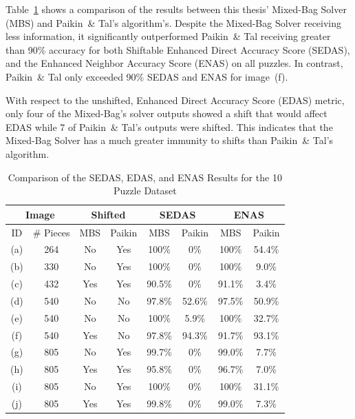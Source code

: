 Table~\ref{tab:pomeranzBestBuddiesVisualizations} shows a comparison of the results between this thesis' Mixed-Bag Solver (MBS) and Paikin~\& Tal's algorithm's.  Despite the Mixed-Bag Solver receiving less information, it significantly outperformed Paikin~\& Tal receiving greater than 90\% accuracy for both  Shiftable Enhanced Direct Accuracy Score (SEDAS), and the Enhanced Neighbor Accuracy Score (ENAS) on all puzzles.  In contrast, Paikin~\& Tal only exceeded 90\% SEDAS and ENAS for image~(f). 

With respect to the unshifted, Enhanced Direct Accuracy Score (EDAS) metric, only four of the Mixed-Bag's solver outputs showed a shift that would affect EDAS while 7 of Paikin~\& Tal's outputs were shifted. This indicates that the Mixed-Bag Solver has a much greater immunity to shifts than Paikin~\& Tal's algorithm.

\begin{table}[tb]
\begin{center}
\begin{tabular}{ c|c||c|c||c|c||c|c } 
 \toprule
 \multicolumn{2}{c||}{Image} & \multicolumn{2}{c||}{Shifted} & \multicolumn{2}{c||}{SEDAS} & \multicolumn{2}{c}{ENAS} \\
\hline
 ID  & \# Pieces & MBS & Paikin & MBS & Paikin & MBS & Paikin  \\ 
\hline \hline
 (a) &  264     & No  & Yes & 100\%  & 0\% & 100\% & 54.4\% \\ 
\hline
 (b) &  330     & No  & Yes & 100\%  & 0\% & 100\% &  9.0\% \\ 
\hline
 (c) &  432     & Yes & Yes & 90.5\% &  0\%   & 91.1\% & 3.4\% \\  
\hline
 (d) &  540     & No  & No  & 97.8\% & 52.6\% & 97.5\% & 50.9\% \\ 
\hline
 (e) &  540     & No  & No  & 100\%  &  5.9\% & 100\%  & 32.7\% \\ 
\hline
 (f) &  540     & Yes & No  & 97.8\% & 94.3\% & 91.7\% & 93.1\% \\ 
\hline
 (g) &  805     & No  & Yes & 99.7\% &  0\%   & 99.0\% &  7.7\% \\ 
\hline
 (h) &  805     & Yes & Yes & 95.8\% &  0\%   & 96.7\% &  7.0\% \\ 
\hline
 (i) &  805     & No  & Yes & 100\%  &  0\%   & 100\%  &  31.1\% \\ 
\hline
 (j) &  805     & Yes & Yes & 99.8\% &  0\%   & 99.0\% &   7.3\% \\ 
 \bottomrule
\end{tabular}
\end{center}
\caption{Comparison of the SEDAS, EDAS, and ENAS Results for the 10 Puzzle Dataset}\label{tab:pomeranzBestBuddiesVisualizations}
\end{table}